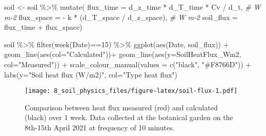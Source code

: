 \documentclass[
]{article}
\newenvironment{Shaded}{\begin{snugshade}}{\end{snugshade}}
\newcommand{\AttributeTok}[1]{\textcolor[rgb]{0.77,0.63,0.00}{#1}}
\newcommand{\CommentTok}[1]{\textcolor[rgb]{0.56,0.35,0.01}{\textit{#1}}}
\newcommand{\DecValTok}[1]{\textcolor[rgb]{0.00,0.00,0.81}{#1}}
\newcommand{\FunctionTok}[1]{\textcolor[rgb]{0.00,0.00,0.00}{#1}}
\newcommand{\NormalTok}[1]{#1}
\newcommand{\OtherTok}[1]{\textcolor[rgb]{0.56,0.35,0.01}{#1}}
\newcommand{\SpecialCharTok}[1]{\textcolor[rgb]{0.00,0.00,0.00}{#1}}
\newcommand{\StringTok}[1]{\textcolor[rgb]{0.31,0.60,0.02}{#1}}
\begin{document}
\begin{Shaded}
\begin{Highlighting}[]
\NormalTok{soil }\OtherTok{\textless{}{-}}\NormalTok{ soil }\SpecialCharTok{\%\textgreater{}\%} 
  \FunctionTok{mutate}\NormalTok{(}
    \AttributeTok{flux\_time =}\NormalTok{ d\_z\_time }\SpecialCharTok{*}\NormalTok{ d\_T\_time }\SpecialCharTok{*}\NormalTok{ Cv }\SpecialCharTok{/}\NormalTok{ d\_t, }\CommentTok{\# W m{-}2 }
    \AttributeTok{flux\_space =} \SpecialCharTok{{-}}\NormalTok{ k }\SpecialCharTok{*}\NormalTok{ (d\_T\_space }\SpecialCharTok{/}\NormalTok{ d\_z\_space), }\CommentTok{\# W m{-}2 }
    \AttributeTok{soil\_flux =}\NormalTok{ flux\_time }\SpecialCharTok{+}\NormalTok{ flux\_space)}
\end{Highlighting}
\end{Shaded}

\newpage

\begin{Shaded}
\begin{Highlighting}[]
\NormalTok{soil }\SpecialCharTok{\%\textgreater{}\%} 
  \FunctionTok{filter}\NormalTok{(}\FunctionTok{week}\NormalTok{(Date)}\SpecialCharTok{==}\DecValTok{15}\NormalTok{) }\SpecialCharTok{\%\textgreater{}\%} 
  \FunctionTok{ggplot}\NormalTok{(}\FunctionTok{aes}\NormalTok{(Date, soil\_flux)) }\SpecialCharTok{+}
  \FunctionTok{geom\_line}\NormalTok{(}\FunctionTok{aes}\NormalTok{(}\AttributeTok{col=}\StringTok{"Calculated"}\NormalTok{))}\SpecialCharTok{+}
  \FunctionTok{geom\_line}\NormalTok{(}\FunctionTok{aes}\NormalTok{(}\AttributeTok{y=}\NormalTok{SoilHeatFlux\_Wm2, }\AttributeTok{col=}\StringTok{"Measured"}\NormalTok{)) }\SpecialCharTok{+}
  \FunctionTok{scale\_colour\_manual}\NormalTok{(}\AttributeTok{values =} \FunctionTok{c}\NormalTok{(}\StringTok{"black"}\NormalTok{, }\StringTok{"\#F8766D"}\NormalTok{)) }\SpecialCharTok{+}
  \FunctionTok{labs}\NormalTok{(}\AttributeTok{y=}\StringTok{"Soil heat flux (W/m2)"}\NormalTok{, }\AttributeTok{col=}\StringTok{"Type heat flux"}\NormalTok{)}
\end{Highlighting}
\end{Shaded}

\begin{figure}
\centering
\texttt{[image: 8\_soil\_physics\_files/figure-latex/soil-flux-1.pdf]}
\caption{\label{fig:soil-flux}Comparison between heat flux measured (red) and calculated (black) over 1 week. Data collected at the botanical garden on the 8th-15th April 2021 at frequency of 10 minutes.}
\end{figure}
\end{document}
